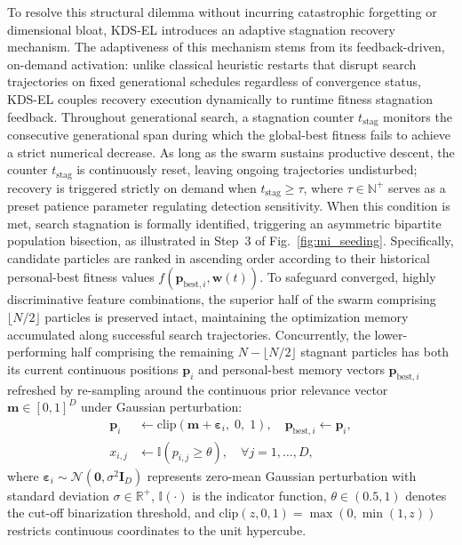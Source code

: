 To resolve this structural dilemma without incurring catastrophic forgetting or dimensional bloat, KDS-EL introduces an adaptive stagnation recovery mechanism. The adaptiveness of this mechanism stems from its feedback-driven, on-demand activation: unlike classical heuristic restarts that disrupt search trajectories on fixed generational schedules regardless of convergence status, KDS-EL couples recovery execution dynamically to runtime fitness stagnation feedback. Throughout generational search, a stagnation counter $t_{\mathrm{stag}}$ monitors the consecutive generational span during which the global-best fitness fails to achieve a strict numerical decrease. As long as the swarm sustains productive descent, the counter $t_{\mathrm{stag}}$ is continuously reset, leaving ongoing trajectories undisturbed; recovery is triggered strictly on demand when $t_{\mathrm{stag}} \ge \tau$, where $\tau \in \mathbb{N}^+$ serves as a preset patience parameter regulating detection sensitivity. When this condition is met, search stagnation is formally identified, triggering an asymmetric bipartite population bisection, as illustrated in Step~3 of Fig.~\ref{fig:mi_seeding}. Specifically, candidate particles are ranked in ascending order according to their historical personal-best fitness values $f(\mathbf{p}_{\mathrm{best},i}, \mathbf{w}(t))$. To safeguard converged, highly discriminative feature combinations, the superior half of the swarm comprising $\lfloor N/2 \rfloor$ particles is preserved intact, maintaining the optimization memory accumulated along successful search trajectories. Concurrently, the lower-performing half comprising the remaining $N - \lfloor N/2 \rfloor$ stagnant particles has both its current continuous positions $\mathbf{p}_i$ and personal-best memory vectors $\mathbf{p}_{\mathrm{best},i}$ refreshed by re-sampling around the continuous prior relevance vector $\mathbf{m} \in [0, 1]^D$ under Gaussian perturbation:
\begin{equation}
\begin{aligned}
\mathbf{p}_i &\leftarrow \mathrm{clip}\left(\mathbf{m} + \boldsymbol{\varepsilon}_i, \; 0, \; 1\right), \quad \mathbf{p}_{\mathrm{best},i} \leftarrow \mathbf{p}_i, \\
x_{i,j} &\leftarrow \mathbb{I}(p_{i,j} \ge \theta), \quad \forall j = 1, \dots, D,
\end{aligned}
\label{eq:reinit_formula}
\end{equation}
where $\boldsymbol{\varepsilon}_i \sim \mathcal{N}(\mathbf{0}, \sigma^2 \mathbf{I}_D)$ represents zero-mean Gaussian perturbation with standard deviation $\sigma \in \mathbb{R}^+$, $\mathbb{I}(\cdot)$ is the indicator function, $\theta \in (0.5, 1)$ denotes the cut-off binarization threshold, and $\mathrm{clip}(z, 0, 1) = \max(0, \min(1, z))$ restricts continuous coordinates to the unit hypercube.

